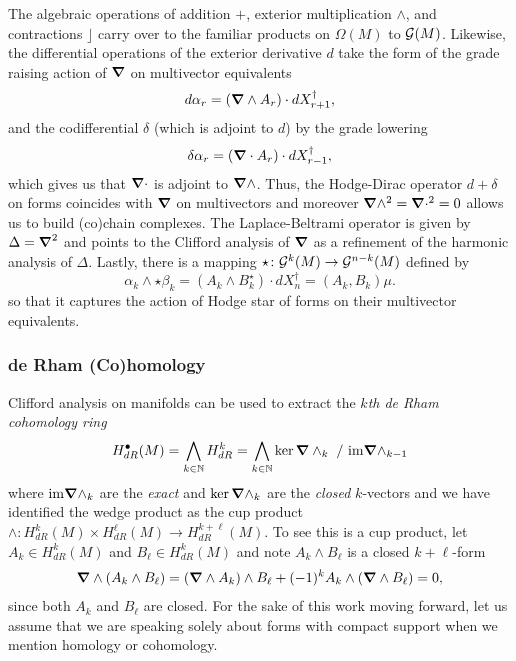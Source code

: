 \documentclass[conf]{new-aiaa}
\begin{document}
The algebraic operations of addition $+$, exterior multiplication $\wedge$, and contractions $\rfloor$ carry over to the familiar products on $\Omega(M)$ to $\mathcal{G}(M)$. Likewise, the differential operations of the exterior derivative $d$ take the form of the grade raising action of $\boldsymbol{\nabla}$ on multivector equivalents
\begin{equation}
d \alpha_r = (\boldsymbol{\nabla} \wedge A_r) \cdot dX_{r+1}^\dagger,
\end{equation}
and the codifferential $\delta$ (which is adjoint to $d$) by the grade lowering
\begin{equation}
\delta \alpha_r = (\boldsymbol{\nabla} \cdot A_r)\cdot dX_{r-1}^\dagger,
\end{equation} 
which gives us that $\boldsymbol{\nabla} \cdot$ is adjoint to $\boldsymbol{\nabla} \wedge$. Thus, the Hodge-Dirac operator $d+\delta$ on forms coincides with $\boldsymbol{\nabla}$ on multivectors and moreover $\boldsymbol{\nabla} \wedge^2 = \boldsymbol{\nabla} \cdot^2=0$ allows us to build (co)chain complexes. The Laplace-Beltrami operator is given by $\Delta = \boldsymbol{\nabla}^2$ and points to the Clifford analysis of $\boldsymbol{\nabla}$ as a refinement of the harmonic analysis of $\Delta$. Lastly, there is a mapping $\star \colon \mathcal{G}^k(M)\to \mathcal{G}^{n-k}(M)$ defined by
\begin{equation}
\alpha_k \wedge \star \beta_k = (A_k \wedge B_k^{\star})\cdot dX_n^\dagger = (A_k,B_k) \mu.
\end{equation}
so that it captures the action of Hodge star of forms on their multivector equivalents. 

\subsubsection{de Rham (Co)homology}

\label{subsubsec:derham}

Clifford analysis on manifolds can be used to extract the \emph{$k$th de Rham cohomology ring}
\begin{equation}
H^\bullet_{dR}(M) = \bigwedge_{k \in \mathbb{N}} H^k_{dR} = \bigwedge_{k \in \mathbb{N}} \ker \boldsymbol{\nabla} \wedge_k ~/~ \mathrm{im} \boldsymbol{\nabla} \wedge_{k-1}
\end{equation}
where $\mathrm{im} \boldsymbol{\nabla} \wedge_k$ are the \emph{exact} and $\ker \boldsymbol{\nabla} \wedge_k$ are the \emph{closed} $k$-vectors and we have identified the wedge product as the cup product $\wedge \colon H^k_{dR}(M) \times H^\ell_{dR}(M) \to H^{k+\ell}_{dR}(M)$. To see this is a cup product, let $A_k \in H^k_{dR}(M)$ and $B_\ell \in H^k_{dR}(M)$ and note $A_k \wedge B_\ell$ is a closed $k+\ell$-form
\begin{align}
\boldsymbol{\nabla} \wedge (A_k \wedge B_\ell) = (\boldsymbol{\nabla} \wedge A_k) \wedge B_\ell + (-1)^k A_k \wedge (\boldsymbol{\nabla} \wedge B_\ell) = 0,
\end{align}
since both $A_k$ and $B_\ell$ are closed. For the sake of this work moving forward, let us assume that we are speaking solely about forms with compact support when we mention homology or cohomology.
\end{document}
